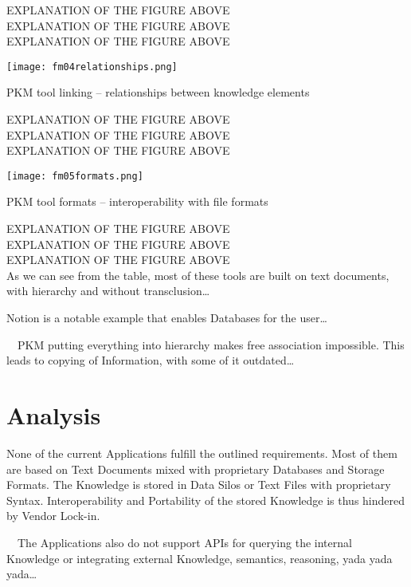 EXPLANATION OF THE FIGURE ABOVE \\
EXPLANATION OF THE FIGURE ABOVE \\
EXPLANATION OF THE FIGURE ABOVE \\


\begin{table}[H]
    \centering
    \texttt{[image: fm04relationships.png]}
    \caption{PKM tool linking -- relationships between knowledge elements}
    \label{fig:fm04}
\end{table}

EXPLANATION OF THE FIGURE ABOVE \\
EXPLANATION OF THE FIGURE ABOVE \\
EXPLANATION OF THE FIGURE ABOVE \\


\begin{table}[H]
    \centering
    \texttt{[image: fm05formats.png]}
    \caption{PKM tool formats -- interoperability with file formats}
    \label{fig:fm05}
\end{table}

EXPLANATION OF THE FIGURE ABOVE \\
EXPLANATION OF THE FIGURE ABOVE \\
EXPLANATION OF THE FIGURE ABOVE \\


As we can see from the table, most of these tools are built on text documents, with hierarchy and without transclusion…

Notion is a notable example that enables Databases for the user…

~~PKM putting everything into hierarchy makes free association impossible. This leads to copying of Information, with some of it outdated…~~

\section{Analysis}

None of the current Applications fulfill the outlined requirements. Most of them are based on Text Documents mixed with proprietary Databases and Storage Formats. The Knowledge is stored in Data Silos or Text Files with proprietary Syntax. Interoperability and Portability of the stored Knowledge is thus hindered by Vendor Lock-in.

~~The Applications also do not support APIs for querying the internal Knowledge or integrating external Knowledge, semantics, reasoning, yada yada yada…~~

